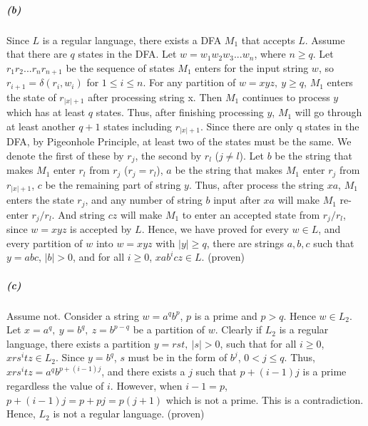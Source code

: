 \documentclass[letterpaper, 12pt]{article}
\theoremstyle{definition}
\numberwithin{equation}{section}
\begin{document}
\subparagraph{(b)} Since $L$ is a regular language, there exists a DFA $M_1$ that accepts $L$. Assume that there are $q$ states in the DFA. Let $w=w_1w_2w_3...w_n$, where $n \geq q$. Let $r_1r_2...r_nr_{n+1}$ be the sequence of states $M_1$ enters for the input string $w$, so $r_{i+1}=\delta(r_i,w_i)$ for $1 \leq i \leq n$. For any partition of $w = xyz,\ y \geq q$, $M_1$ enters the state of $r_{|x|+1}$ after processing string x. Then $M_1$ continues to process $y$ which has at least $q$ states. Thus, after finishing processing $y$, $M_1$ will go through at least another $q+1$ states including $r_{|x|+1}$. Since there are only q states in the DFA, by Pigeonhole Principle, at least two of the states must be the same. We denote the first of these by $r_j$, the second by $r_l$ ($ j \neq l$). Let $b$ be the string that makes $M_1$ enter $r_l$ from $r_j$ ($r_j=r_l$), $a$ be the string that makes $M_1$ enter $r_j$ from $r_{|x|+1}$, $c$ be the remaining part of string $y$. Thus, after process the string $xa$, $M_1$ enters the state $r_j$, and any number of string $b$ input after $xa$ will make $M_1$ re-enter $r_j/r_l$. And string $cz$ will make $M_1$ to enter an accepted state from $r_j/r_l$, since $w=xyz$ is accepted by $L$. Hence, we have proved for every $w \in L$, and every partition of $w$ into $w=xyz$ with $|y| \geq q$, there are strings $a, b, c$ such that $y=abc$, $|b| > 0$, and for all $i\geq0$, $xab^icz \in L$. (proven)

\subparagraph{(c)} Assume not. Consider a string $w=a^qb^p$, $p$ is a prime and $p > q$. Hence $w\in L_2$. Let $x = a^q,\ y=b^q,\ z =b^{p-q}$ be a partition of $w$. Clearly if $L_2$ is a regular language, there exists a partition $y=rst,\ |s| >0$, such that for all $i \geq 0$, $xrs^itz \in L_2$. Since $y =b^q$, $s$ must be in the form of $b^j$, $0<j\leq q$. Thus, $xrs^itz = a^qb^{p+(i-1)j}$, and there exists a $j$ such that $p+(i-1)j$ is a prime regardless the value of $i$. However, when $i-1 = p$, $p+(i-1)j= p+pj=p(j+1)$ which is not a prime. This is a contradiction. Hence, $L_2$ is not a regular language. (proven)
\newpage
\end{document}
